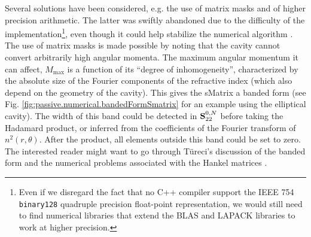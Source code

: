 Several solutions have been considered, e.g. the use of matrix masks
and of higher precision arithmetic. The latter was swiftly abandoned
due to the difficulty of the implementation\footnote{Even if we disregard
the fact that no C++ compiler support the IEEE 754 \texttt{binary128}
quadruple precision float-point representation, we would still need
to find numerical libraries that extend the BLAS and LAPACK libraries
to work at higher precision.}, even though it could help stabilize the
numerical algorithm \cite[\S 5.8.4]{MIS2002}. The use of matrix masks is 
made possible by noting that the cavity cannot convert arbitrarily
high angular momenta. The maximum angular momentum it can affect, 
$M_\text{max}$ is a function of its ``degree of inhomogeneity'', 
characterized by the absolute size of the Fourier components
of the refractive index (which also depend on the geometry
of the cavity). This gives the \gls{sMatrix} a banded form 
(see Fig. \ref{fig:passive.numerical.bandedFormSmatrix} for
an example using the elliptical cavity). The width of
this band could be detected in $\mathbf{S}^{0,N}_{22}$ before
taking the Hadamard product, or inferred from the coefficients
of the Fourier transform of $n^2(r,\theta)$. After the product, all elements
outside this band could be set to zero. The interested 
reader might want to go through Türeci's discussion of
the banded form and the numerical problems associated 
with the Hankel matrices \cite[\S 3.4]{TUR2003}.

